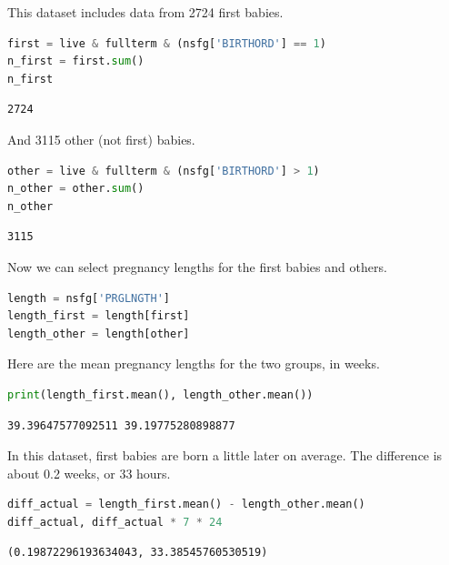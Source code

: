 This dataset includes data from 2724 first babies.

\begin{lstlisting}[language=Python,style=source]
first = live & fullterm & (nsfg['BIRTHORD'] == 1)
n_first = first.sum()
n_first
\end{lstlisting}

\begin{lstlisting}[style=output]
2724
\end{lstlisting}

And 3115 other (not first) babies.

\begin{lstlisting}[language=Python,style=source]
other = live & fullterm & (nsfg['BIRTHORD'] > 1)
n_other = other.sum()
n_other
\end{lstlisting}

\begin{lstlisting}[style=output]
3115
\end{lstlisting}

Now we can select pregnancy lengths for the first babies and others.

\begin{lstlisting}[language=Python,style=source]
length = nsfg['PRGLNGTH']
length_first = length[first]
length_other = length[other]
\end{lstlisting}

Here are the mean pregnancy lengths for the two groups, in weeks.

\begin{lstlisting}[language=Python,style=source]
print(length_first.mean(), length_other.mean())
\end{lstlisting}

\begin{lstlisting}[style=output]
39.39647577092511 39.19775280898877
\end{lstlisting}

In this dataset, first babies are born a little later on average. The
difference is about 0.2 weeks, or 33 hours.

\begin{lstlisting}[language=Python,style=source]
diff_actual = length_first.mean() - length_other.mean()
diff_actual, diff_actual * 7 * 24
\end{lstlisting}

\begin{lstlisting}[style=output]
(0.19872296193634043, 33.38545760530519)
\end{lstlisting}

